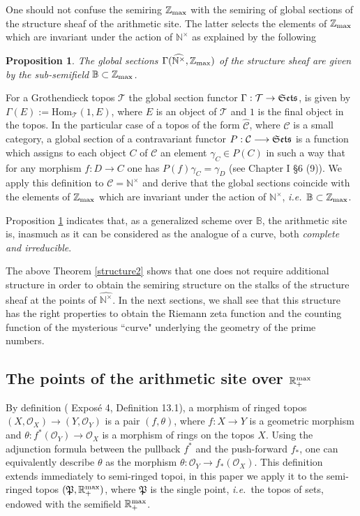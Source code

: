 \documentclass[noams,lp]{compositio}
\newtheorem{prop}[thm]{Proposition}
\def\Hom{{\rm Hom}}
\def\B{{\mathbb B}}
\def\N{{\mathbb N}}
\def\R{{\mathbb R}}
\def\Z{{\mathbb Z}}
\def\pt{\mathfrak P}
\def\cC{{\mathcal C}}
\def\cO{{\mathcal O}}
\def\cT{{\mathcal T}}
\newcommand{\ie}{{\it i.e.\/}\ }
\def\Hom {{\mbox{Hom}}}
\def\zmax{{\Z_{\rm max}}}
\def\rmax{\R_+^{\rm max}}
\def\Se{\frak{ Sets}}
\def\nt{\N^{\times}}
\def\wnt{{\widehat{\N^{\times}}}}
\begin{document}
One should not confuse the semiring $\zmax$ with the semiring of  global sections of the structure sheaf of the arithmetic site. The latter selects the elements of $\zmax$ which are invariant under the action of $\nt$ as explained by the following
\begin{prop}\label{propglobsect} The global sections $\Gamma(\wnt,\zmax)$ of the structure sheaf  are given by the sub-semifield $\B\subset \zmax$.
\end{prop}
\proof For a Grothendieck topos $\cT$ the global section functor $\Gamma:\cT\to \Se$,  is given by $\Gamma(E):=\Hom_\cT(1,E)$, where $E$ is an object of $\cT$ and $1$ is the final object in the topos.
In the particular case of a topos of the form $\hat \cC$, where $\cC$ is a small category, a global section of a contravariant functor $P: \cC\longrightarrow\Se$ is a function which assigns to each object $C$ of $\cC$ an element $\gamma_C\in P(C)$ in such a way that for any morphism $f:D\to C$ one has $P(f)\gamma_C=\gamma_D$
(see \cite{MM} Chapter I \S 6 (9)). We apply this definition to $\cC=\nt$ and derive that the global sections coincide with the elements of $\zmax$ which are invariant under the action of $\nt$, \ie $\B\subset \zmax$.\endproof

Proposition \ref{propglobsect} indicates that, as a generalized scheme over $\B$, the arithmetic site is, inasmuch as it can be considered as the analogue of a curve, both {\em complete and irreducible}.


The above Theorem \ref{structure2} shows that one does not require additional structure in order to obtain the semiring structure on the stalks of the structure sheaf at the points of $\wnt$. In the next sections, we shall see that this structure has the right properties to obtain the Riemann zeta function and the counting function of the mysterious ``curve" underlying the geometry of the prime numbers.



\subsection{The points of the arithmetic site over $\rmax$}\label{sectrmax}


By definition (\!\!\cite{AGV} Expos\'e 4, Definition 13.1), a morphism of  ringed topos $(X,\cO_X)\to (Y,\cO_Y)$ is a pair $(f,\theta)$, where $f:X\to Y$ is a geometric morphism   and $\theta: f^*(\cO_Y)\to \cO_X$ is a morphism of rings on the topos $X$. Using the adjunction formula between the pullback $f^*$ and the push-forward $f_*$, one can equivalently describe $\theta$ as the morphism $\theta: \cO_Y\to f_*(\cO_X)$. This definition extends immediately to semi-ringed topoi, in this paper we apply it to the semi-ringed topos $(\pt,\rmax)$, where $\pt$ is the single point, \ie the topos of sets, endowed with the semifield $\rmax$.
\end{document}
